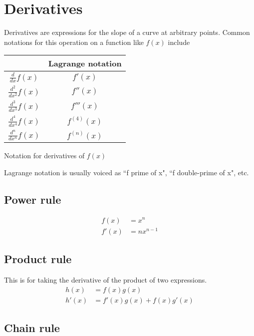 \section{Derivatives}

Derivatives are expressions for the slope of a curve at arbitrary points. Common
notations for this operation on a function like $f(x)$ include
\begin{booktable}
  \begin{tabular}{|cc|}
    \hline
    \rowcolor{headingbg}
    \multicolumn{1}{|c}{\textbf{Leibniz notation}} &
      \multicolumn{1}{c|}{\textbf{Lagrange notation}} \\
    \hline
    $\frac{d}{dx} f(x)$ & $f'(x)$ \\
    $\frac{d^2}{dx^2} f(x)$ & $f''(x)$ \\
    $\frac{d^3}{dx^3} f(x)$ & $f'''(x)$ \\
    $\frac{d^4}{dx^4} f(x)$ & $f^{(4)}(x)$ \\
    $\frac{d^n}{dx^n} f(x)$ & $f^{(n)}(x)$ \\
    \hline
  \end{tabular}
  \caption{Notation for derivatives of $f(x)$}
\end{booktable}

Lagrange notation is usually voiced as ``f prime of x", ``f double-prime of x",
etc.

\subsection{Power rule}
\begin{align*}
  f(x) &= x^n \\
  f'(x) &= nx^{n - 1}
\end{align*}

\subsection{Product rule}

This is for taking the derivative of the product of two expressions.
\begin{align*}
  h(x) &= f(x)g(x) \\
  h'(x) &= f'(x)g(x) + f(x)g'(x)
\end{align*}

\subsection{Chain rule}

